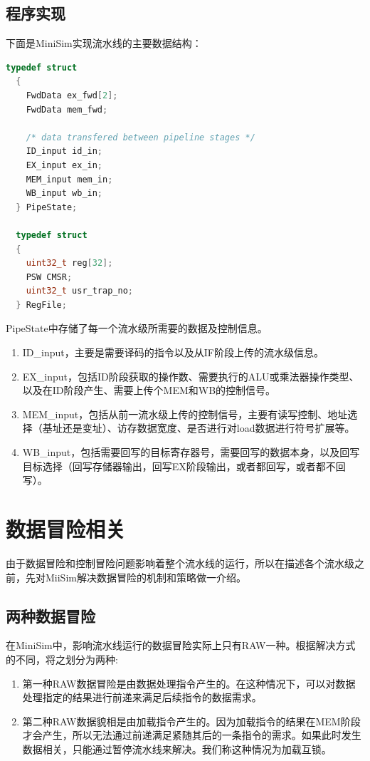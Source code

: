 \documentclass[12pt,a4paper,Flow]{report}
\begin{document}
\subsection{程序实现}
下面是MiniSim实现流水线的主要数据结构：
\begin{lstlisting}[language=c]
  typedef struct
  {
    FwdData ex_fwd[2];
    FwdData mem_fwd;

    /* data transfered between pipeline stages */
    ID_input id_in;
    EX_input ex_in;
    MEM_input mem_in;
    WB_input wb_in;
  } PipeState;

  typedef struct
  {
    uint32_t reg[32];
    PSW CMSR;
    uint32_t usr_trap_no;
  } RegFile;
\end{lstlisting}
PipeState中存储了每一个流水级所需要的数据及控制信息。
\begin{enumerate}
\item ID\_input，主要是需要译码的指令以及从IF阶段上传的流水级信息。
\item EX\_input，包括ID阶段获取的操作数、需要执行的ALU或乘法器操作类型、以及在ID阶段产生、需要上传个MEM和WB的控制信号。
\item MEM\_input，包括从前一流水级上传的控制信号，主要有读写控制、地址选择（基址还是变址）、访存数据宽度、是否进行对load数据进行符号扩展等。
\item WB\_input，包括需要回写的目标寄存器号，需要回写的数据本身，以及回写目标选择（回写存储器输出，回写EX阶段输出，或者都回写，或者都不回写）。
\end{enumerate}
\section{数据冒险相关}
由于数据冒险和控制冒险问题影响着整个流水线的运行，所以在描述各个流水级之前，先对MiiSim解决数据冒险的机制和策略做一介绍。
\subsection{两种数据冒险}
在MiniSim中，影响流水线运行的数据冒险实际上只有RAW一种。根据解决方式的不同，将之划分为两种:
\begin{enumerate}
\item 第一种RAW数据冒险是由数据处理指令产生的。在这种情况下，可以对数据处理指定的结果进行前递来满足后续指令的数据需求。
\item 第二种RAW数据貌相是由加载指令产生的。因为加载指令的结果在MEM阶段才会产生，所以无法通过前递满足紧随其后的一条指令的需求。如果此时发生数据相关，只能通过暂停流水线来解决。我们称这种情况为加载互锁。
\end{enumerate}
\end{document}

